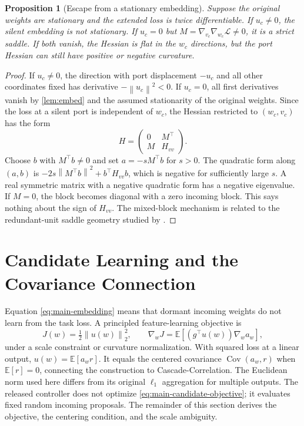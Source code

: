 \documentclass[10pt]{article}
\theoremstyle{paper}
\newtheorem{proposition}[theorem]{Proposition}
\newcommand{\E}{\mathbb E}
\newcommand{\Lcal}{\mathcal L}
\newcommand{\norm}[1]{\left\lVert #1\right\rVert}
\DeclareMathOperator{\Cov}{Cov}
\begin{document}
\begin{proposition}[Escape from a stationary embedding]
\label{prop:escape}
Suppose the original weights are stationary and the extended loss is twice differentiable. If $u_c\ne0$, the silent embedding is not stationary. If $u_c=0$ but $M=\nabla_{v_c}\nabla_{w_c}\Lcal\ne0$, it is a strict saddle. If both vanish, the Hessian is flat in the $w_c$ directions, but the port Hessian can still have positive or negative curvature.
\end{proposition}
\begin{proof}
If $u_c\ne0$, the direction with port displacement $-u_c$ and all other coordinates fixed has derivative $-\norm{u_c}^2<0$. If $u_c=0$, all first derivatives vanish by \cref{lem:embed} and the assumed stationarity of the original weights. Since the loss at a silent port is independent of $w_c$, the Hessian restricted to $(w_c,v_c)$ has the form
\[
H=\begin{pmatrix}0&M^\top\\M&H_{vv}\end{pmatrix}.
\]
Choose $b$ with $M^\top b\ne0$ and set $a=-sM^\top b$ for $s>0$. The quadratic form along $(a,b)$ is $-2s\norm{M^\top b}^2+b^\top H_{vv}b$, which is negative for sufficiently large $s$. A real symmetric matrix with a negative quadratic form has a negative eigenvalue. If $M=0$, the block becomes diagonal with a zero incoming block. This says nothing about the sign of $H_{vv}$. The mixed-block mechanism is related to the redundant-unit saddle geometry studied by \citet{fukumizu2000local}.
\end{proof}

\section{Candidate Learning and the Covariance Connection}
\label{app:candidates}
Equation \eqref{eq:main-embedding} means that dormant incoming weights do not learn from the task loss. A principled feature-learning objective is
\begin{equation}
J(w)=\tfrac12\norm{u(w)}_2^2,
\qquad
\nabla_wJ=\E\!\left[(g^\top u(w))\nabla_wa_w\right],
\label{eq:main-candidate-objective}
\end{equation}
under a scale constraint or curvature normalization. With squared loss at a linear output, $u(w)=\E[a_wr]$. It equals the centered covariance $\Cov(a_w,r)$ when $\E[r]=0$, connecting the construction to Cascade-Correlation. The Euclidean norm used here differs from its original $\ell_1$ aggregation for multiple outputs. The released controller does not optimize \cref{eq:main-candidate-objective}; it evaluates fixed random incoming proposals. The remainder of this section derives the objective, the centering condition, and the scale ambiguity.
\end{document}
